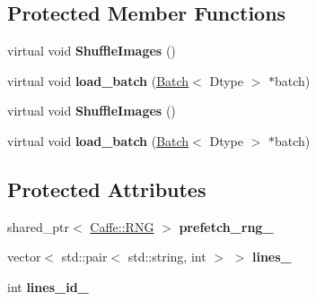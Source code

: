 \subsection*{Protected Member Functions}
\begin{DoxyCompactItemize}
\item 
\mbox{\label{classcaffe_1_1_image_data_layer_a1726e1385072928d37d960c52f0d20b4}} 
virtual void {\bfseries Shuffle\+Images} ()
\item 
\mbox{\label{classcaffe_1_1_image_data_layer_ae75501864cc0d1e18d8d05b1f601fc89}} 
virtual void {\bfseries load\+\_\+batch} (\mbox{\hyperlink{classcaffe_1_1_batch}{Batch}}$<$ Dtype $>$ $\ast$batch)
\item 
\mbox{\label{classcaffe_1_1_image_data_layer_a1726e1385072928d37d960c52f0d20b4}} 
virtual void {\bfseries Shuffle\+Images} ()
\item 
\mbox{\label{classcaffe_1_1_image_data_layer_ae75501864cc0d1e18d8d05b1f601fc89}} 
virtual void {\bfseries load\+\_\+batch} (\mbox{\hyperlink{classcaffe_1_1_batch}{Batch}}$<$ Dtype $>$ $\ast$batch)
\end{DoxyCompactItemize}
\subsection*{Protected Attributes}
\begin{DoxyCompactItemize}
\item 
\mbox{\label{classcaffe_1_1_image_data_layer_a3c43161334b0bcbec0566c6484e18792}} 
shared\+\_\+ptr$<$ \mbox{\hyperlink{classcaffe_1_1_caffe_1_1_r_n_g}{Caffe\+::\+R\+NG}} $>$ {\bfseries prefetch\+\_\+rng\+\_\+}
\item 
\mbox{\label{classcaffe_1_1_image_data_layer_a16a68f073ac256c40f47b7a28d686857}} 
vector$<$ std\+::pair$<$ std\+::string, int $>$ $>$ {\bfseries lines\+\_\+}
\item 
\mbox{\label{classcaffe_1_1_image_data_layer_a943f32fdd8d0d37883500b6d83d4243f}} 
int {\bfseries lines\+\_\+id\+\_\+}
\end{DoxyCompactItemize}


